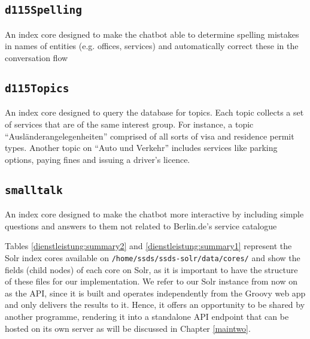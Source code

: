 \begin{flushleft}
	
	\subsection*{\texttt{d115Spelling}}
	An index core designed to make the chatbot able to determine spelling mistakes in names of entities (e.g. offices, services) and automatically correct these in the conversation flow
	
	\subsection*{\texttt{d115Topics}}
	An index core designed to query the database for topics. Each topic collects a set of services that are of the same interest group. For instance, a topic ``Ausländerangelegenheiten'' comprised of all sorts of visa and residence permit types. Another topic on ``Auto und Verkehr'' includes services like parking options, paying fines and issuing a driver's licence.
	
	\subsection*{\texttt{smalltalk}}
	An index core designed to make the chatbot more interactive by including simple questions and answers to them not related to Berlin.de's service catalogue
	
	
	


\end{flushleft}




Tables \ref{dienstleistung:summary2} and \ref{dienstleistung:summary1} represent the Solr index cores available on \texttt{/home/ssds/ssds-solr/data/cores/} and show the fields (child nodes) of each core on Solr, as it is important to have the structure of these files for our implementation.%
We refer to our Solr instance from now on as the API, since it is built and operates independently from the Groovy web app and only delivers the results to it. Hence, it offers an opportunity to be shared by another programme, rendering it into a standalone API endpoint that can be hosted on its own server as will be discussed in Chapter \ref{maintwo}.

